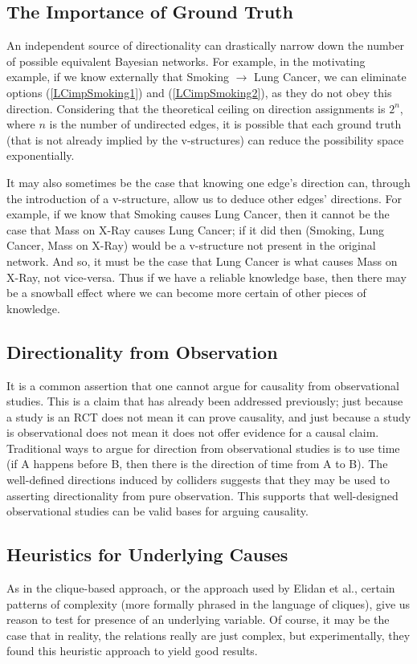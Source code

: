 \documentclass{article}
\begin{document}
	\subsection{The Importance of Ground Truth}
	An independent source of directionality can drastically narrow down the number of possible equivalent Bayesian networks. For example, in the motivating example, if we know externally that Smoking $\rightarrow$ Lung Cancer, we can eliminate options (\ref{LCimpSmoking1}) and (\ref{LCimpSmoking2}), as they do not obey this direction.
	Considering that the theoretical ceiling on direction assignments is $2^n$, where $n$ is the number of undirected edges, it is possible that each ground truth (that is not already implied by the v-structures) can reduce the possibility space exponentially.
	
	It may also sometimes be the case that knowing one edge's direction can, through the introduction of a v-structure, allow us to deduce other edges' directions.
	For example, if we know that Smoking causes Lung Cancer, then it cannot be the case that Mass on X-Ray causes Lung Cancer; if it did then (Smoking, Lung Cancer, Mass on X-Ray) would be a v-structure not present in the original network.
	And so, it must be the case that Lung Cancer is what causes Mass on X-Ray, not vice-versa.
	Thus if we have a reliable knowledge base, then there may be a snowball effect where we can become more certain of other pieces of knowledge.
	
	\subsection{Directionality from Observation}
	It is a common assertion that one cannot argue for causality from observational studies.
	This is a claim that has already been addressed previously; just because a study is an RCT does not mean it can prove causality, and just because a study is observational does not mean it does not offer evidence for a causal claim.
	Traditional ways to argue for direction from observational studies is to use time (if A happens before B, then there is the direction of time from A to B).
	The well-defined directions induced by colliders suggests that they may be used to asserting directionality from pure observation.
	This supports that well-designed observational studies can be valid bases for arguing causality.
	
	\subsection{Heuristics for Underlying Causes}
	As in the clique-based approach, or the approach used by Elidan et al.\cite{elidanDiscovering2001}, certain patterns of complexity (more formally phrased in the language of cliques), give us reason to test for presence of an underlying variable.
	Of course, it may be the case that in reality, the relations really are just complex, but experimentally, they found this heuristic approach to yield good results.
	
\end{document}
